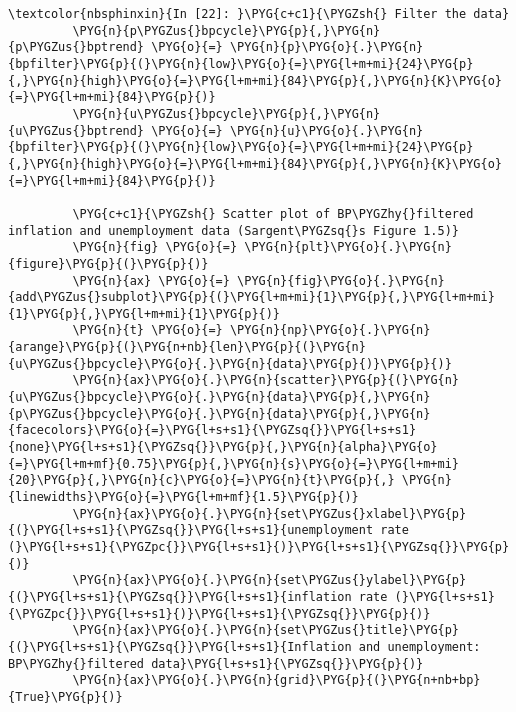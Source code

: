 \documentclass[letterpaper,10pt,openany,oneside,english]{sphinxmanual}
\begin{document}
\noindent{}

%
\begin{Verbatim}[commandchars=\\\{\}]
\textcolor{nbsphinxin}{In [22]: }\PYG{c+c1}{\PYGZsh{} Filter the data}
         \PYG{n}{p\PYGZus{}bpcycle}\PYG{p}{,}\PYG{n}{p\PYGZus{}bptrend} \PYG{o}{=} \PYG{n}{p}\PYG{o}{.}\PYG{n}{bpfilter}\PYG{p}{(}\PYG{n}{low}\PYG{o}{=}\PYG{l+m+mi}{24}\PYG{p}{,}\PYG{n}{high}\PYG{o}{=}\PYG{l+m+mi}{84}\PYG{p}{,}\PYG{n}{K}\PYG{o}{=}\PYG{l+m+mi}{84}\PYG{p}{)}
         \PYG{n}{u\PYGZus{}bpcycle}\PYG{p}{,}\PYG{n}{u\PYGZus{}bptrend} \PYG{o}{=} \PYG{n}{u}\PYG{o}{.}\PYG{n}{bpfilter}\PYG{p}{(}\PYG{n}{low}\PYG{o}{=}\PYG{l+m+mi}{24}\PYG{p}{,}\PYG{n}{high}\PYG{o}{=}\PYG{l+m+mi}{84}\PYG{p}{,}\PYG{n}{K}\PYG{o}{=}\PYG{l+m+mi}{84}\PYG{p}{)}
         
         \PYG{c+c1}{\PYGZsh{} Scatter plot of BP\PYGZhy{}filtered inflation and unemployment data (Sargent\PYGZsq{}s Figure 1.5)}
         \PYG{n}{fig} \PYG{o}{=} \PYG{n}{plt}\PYG{o}{.}\PYG{n}{figure}\PYG{p}{(}\PYG{p}{)}
         \PYG{n}{ax} \PYG{o}{=} \PYG{n}{fig}\PYG{o}{.}\PYG{n}{add\PYGZus{}subplot}\PYG{p}{(}\PYG{l+m+mi}{1}\PYG{p}{,}\PYG{l+m+mi}{1}\PYG{p}{,}\PYG{l+m+mi}{1}\PYG{p}{)}
         \PYG{n}{t} \PYG{o}{=} \PYG{n}{np}\PYG{o}{.}\PYG{n}{arange}\PYG{p}{(}\PYG{n+nb}{len}\PYG{p}{(}\PYG{n}{u\PYGZus{}bpcycle}\PYG{o}{.}\PYG{n}{data}\PYG{p}{)}\PYG{p}{)}
         \PYG{n}{ax}\PYG{o}{.}\PYG{n}{scatter}\PYG{p}{(}\PYG{n}{u\PYGZus{}bpcycle}\PYG{o}{.}\PYG{n}{data}\PYG{p}{,}\PYG{n}{p\PYGZus{}bpcycle}\PYG{o}{.}\PYG{n}{data}\PYG{p}{,}\PYG{n}{facecolors}\PYG{o}{=}\PYG{l+s+s1}{\PYGZsq{}}\PYG{l+s+s1}{none}\PYG{l+s+s1}{\PYGZsq{}}\PYG{p}{,}\PYG{n}{alpha}\PYG{o}{=}\PYG{l+m+mf}{0.75}\PYG{p}{,}\PYG{n}{s}\PYG{o}{=}\PYG{l+m+mi}{20}\PYG{p}{,}\PYG{n}{c}\PYG{o}{=}\PYG{n}{t}\PYG{p}{,} \PYG{n}{linewidths}\PYG{o}{=}\PYG{l+m+mf}{1.5}\PYG{p}{)}
         \PYG{n}{ax}\PYG{o}{.}\PYG{n}{set\PYGZus{}xlabel}\PYG{p}{(}\PYG{l+s+s1}{\PYGZsq{}}\PYG{l+s+s1}{unemployment rate (}\PYG{l+s+s1}{\PYGZpc{}}\PYG{l+s+s1}{)}\PYG{l+s+s1}{\PYGZsq{}}\PYG{p}{)}
         \PYG{n}{ax}\PYG{o}{.}\PYG{n}{set\PYGZus{}ylabel}\PYG{p}{(}\PYG{l+s+s1}{\PYGZsq{}}\PYG{l+s+s1}{inflation rate (}\PYG{l+s+s1}{\PYGZpc{}}\PYG{l+s+s1}{)}\PYG{l+s+s1}{\PYGZsq{}}\PYG{p}{)}
         \PYG{n}{ax}\PYG{o}{.}\PYG{n}{set\PYGZus{}title}\PYG{p}{(}\PYG{l+s+s1}{\PYGZsq{}}\PYG{l+s+s1}{Inflation and unemployment: BP\PYGZhy{}filtered data}\PYG{l+s+s1}{\PYGZsq{}}\PYG{p}{)}
         \PYG{n}{ax}\PYG{o}{.}\PYG{n}{grid}\PYG{p}{(}\PYG{n+nb+bp}{True}\PYG{p}{)}
\end{Verbatim}
\end{document}
